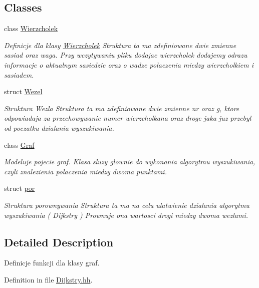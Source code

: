\subsection*{Classes}
\begin{DoxyCompactItemize}
\item 
class \hyperlink{class_wierzcholek}{Wierzcholek}
\begin{DoxyCompactList}\small\item\em Definicje dla klasy \hyperlink{class_wierzcholek}{Wierzcholek} Struktura ta ma zdefiniowane dwie zmienne sasiad oraz waga. Przy wczytywaniu pliku dodajac wierzcholek dodajemy odrazu informacje o aktualnym sasiedzie oraz o wadze polaczenia miedzy wierzcholkiem i sasiadem. \end{DoxyCompactList}\item 
struct \hyperlink{struct_wezel}{Wezel}
\begin{DoxyCompactList}\small\item\em Struktura Wezla Struktura ta ma zdefiniowane dwie zmienne nr oraz g, ktore odpowiadaja za przechowywanie numer wierzcholkana oraz droge jaka juz przebyl od poczatku dzialania wyszukiwania. \end{DoxyCompactList}\item 
class \hyperlink{class_graf}{Graf}
\begin{DoxyCompactList}\small\item\em Modeluje pojecie graf. Klasa sluzy glownie do wykonania algorytmu wyszukiwania, czyli znalezienia polaczenia miedzy dwoma punktami. \end{DoxyCompactList}\item 
struct \hyperlink{structpor}{por}
\begin{DoxyCompactList}\small\item\em Struktura porownywania Struktura ta ma na celu ulatwienie dzialania algorytmu wyszukiwania ( Dijkstry ) Prownuje ona wartosci drogi miedzy dwoma wezlami. \end{DoxyCompactList}\end{DoxyCompactItemize}


\subsection{Detailed Description}
Definicje funkcji dla klasy graf. 

Definition in file \hyperlink{_dijkstry_8hh_source}{Dijkstry.\-hh}.

